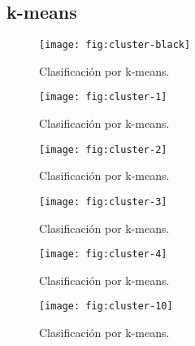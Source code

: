 \subsection{k-means}

\begin{frame}{}
  \begin{figure}
    \centering
    \texttt{[image: fig:cluster-black]}
    \caption{Clasificación por k-means.}
    \label{}
  \end{figure}
\end{frame}

\begin{frame}{}
  \begin{figure}
    \centering
    \texttt{[image: fig:cluster-1]}
    \caption{Clasificación por k-means.}
    \label{}
  \end{figure}
\end{frame}

\begin{frame}{}
  \begin{figure}
    \centering
    \texttt{[image: fig:cluster-2]}
    \caption{Clasificación por k-means.}
    \label{}
  \end{figure}
\end{frame}

\begin{frame}{}
  \begin{figure}
    \centering
    \texttt{[image: fig:cluster-3]}
    \caption{Clasificación por k-means.}
    \label{}
  \end{figure}
\end{frame}

\begin{frame}{}
  \begin{figure}
    \centering
    \texttt{[image: fig:cluster-4]}
    \caption{Clasificación por k-means.}
    \label{}
  \end{figure}
\end{frame}

\begin{frame}{}
  \begin{figure}
    \centering
    \texttt{[image: fig:cluster-10]}
    \caption{Clasificación por k-means.}
    \label{}
  \end{figure}
\end{frame}

